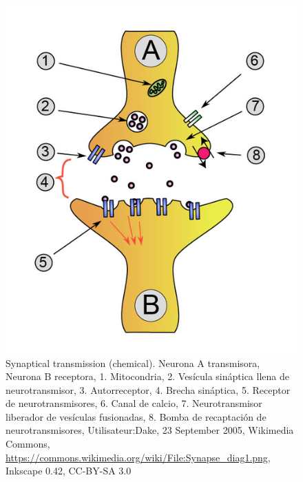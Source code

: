 \begin{figure}[h]
 \centering
 \includegraphics[scale=0.4]{../Figuras/SinapsisQuimica1.png}
 \caption{Synaptical transmission (chemical). Neurona A transmisora, Neurona B receptora, 1. Mitocondria, 2. Vesícula sináptica llena de neurotransmisor, 3. Autorreceptor, 4. Brecha sináptica, 5. Receptor de neurotransmisores, 6. Canal de calcio, 7. Neurotransmisor liberador de vesículas fusionadas, 8. Bomba de recaptación de neurotransmisores, Utilisateur:Dake, 23 September 2005, Wikimedia Commons, \url{https://commons.wikimedia.org/wiki/File:Synapse_diag1.png}, Inkscape 0.42, CC-BY-SA 3.0}
 \label{fig:sinapsisQ}
\end{figure}




